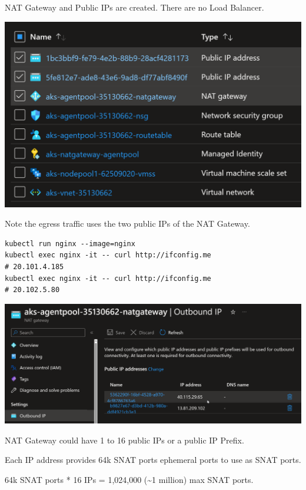 \documentclass[
]{article}
\begin{document}
NAT Gateway and Public IPs are created. There are no Load Balancer.

\includegraphics{images/65_aks_egress_lb_natgw_udr__nat-gw-resources.png}

Note the egress traffic uses the two public IPs of the NAT Gateway.

\begin{lstlisting}
kubectl run nginx --image=nginx
kubectl exec nginx -it -- curl http://ifconfig.me
# 20.101.4.185
kubectl exec nginx -it -- curl http://ifconfig.me
# 20.102.5.80
\end{lstlisting}

\includegraphics{images/65_aks_egress_lb_natgw_udr__nat-gw-pip.png}

NAT Gateway could have 1 to 16 public IPs or a public IP Prefix.

Each IP address provides 64k SNAT ports ephemeral ports to use as SNAT
ports.

64k SNAT ports * 16 IPs = 1,024,000 (\textasciitilde1 million) max SNAT
ports.
\end{document}
